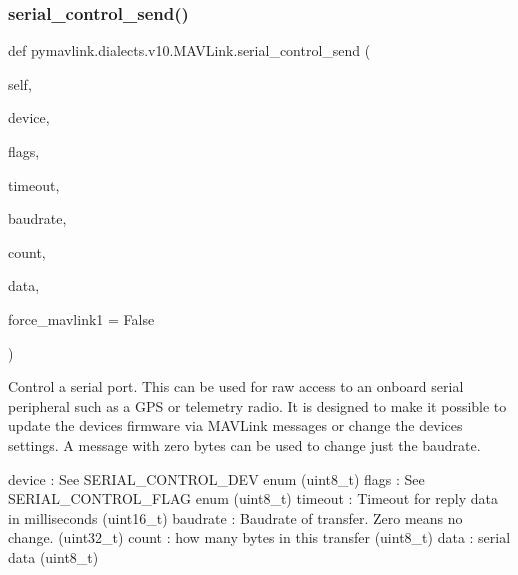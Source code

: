 \begin{DoxyVerb}
\begin{DoxyVerb}
\begin{DoxyVerb}
\begin{DoxyVerb}
\begin{DoxyVerb}
\begin{DoxyVerb}
\begin{DoxyVerb}
\begin{DoxyVerb}
\begin{DoxyVerb}
\begin{DoxyVerb}
\subsubsection{\texorpdfstring{serial\+\_\+control\+\_\+send()}{serial\_control\_send()}}
{\footnotesize\ttfamily def pymavlink.\+dialects.\+v10.\+M\+A\+V\+Link.\+serial\+\_\+control\+\_\+send (\begin{DoxyParamCaption}\item[{}]{self,  }\item[{}]{device,  }\item[{}]{flags,  }\item[{}]{timeout,  }\item[{}]{baudrate,  }\item[{}]{count,  }\item[{}]{data,  }\item[{}]{force\+\_\+mavlink1 = {\ttfamily False} }\end{DoxyParamCaption})}

\begin{DoxyVerb}Control a serial port. This can be used for raw access to an onboard
serial peripheral such as a GPS or telemetry radio. It
is designed to make it possible to update the devices
firmware via MAVLink messages or change the devices
settings. A message with zero bytes can be used to
change just the baudrate.

device                    : See SERIAL_CONTROL_DEV enum (uint8_t)
flags                     : See SERIAL_CONTROL_FLAG enum (uint8_t)
timeout                   : Timeout for reply data in milliseconds (uint16_t)
baudrate                  : Baudrate of transfer. Zero means no change. (uint32_t)
count                     : how many bytes in this transfer (uint8_t)
data                      : serial data (uint8_t)\end{DoxyVerb}
 \mbox{\label{classpymavlink_1_1dialects_1_1v10_1_1MAVLink_ae334ed08110bb079836368f856669953}} 

\end{DoxyVerb}
\end{DoxyVerb}
\end{DoxyVerb}
\end{DoxyVerb}
\end{DoxyVerb}
\end{DoxyVerb}
\end{DoxyVerb}
\end{DoxyVerb}
\end{DoxyVerb}
\end{DoxyVerb}
